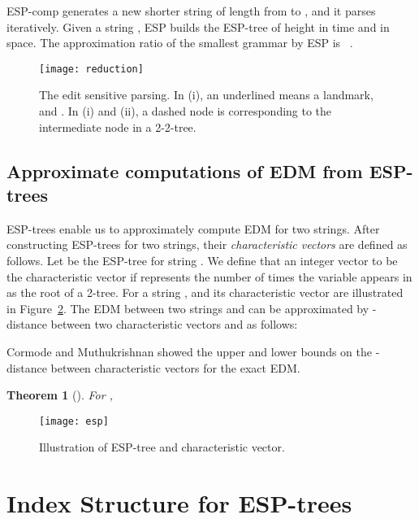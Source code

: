 \documentclass[12pt,a4paper]{scrartcl}
\newtheorem{Theorem}{Theorem}
\begin{document}
ESP-comp generates a new shorter string  of length from  to
, and it parses  iteratively.  Given a string , ESP builds
the ESP-tree of height  in  time and in
 space.  The approximation ratio of the
smallest grammar by ESP is ~\cite{SakamotoMKS09}.

\begin{figure}[t]
\begin{center}
\texttt{[image: reduction]}
\end{center}
\vspace{0.5cm}
\caption{The edit sensitive parsing. In (i), an underlined  means a landmark,
and .
In (i) and (ii), a dashed node is corresponding to the intermediate node in a 2-2-tree.}
\label{fig:reduction}
\end{figure}

\subsection{Approximate computations of EDM from ESP-trees}

ESP-trees enable us to approximately compute EDM for two strings.
After constructing ESP-trees for two strings, 
their \emph{characteristic vectors} are defined as follows.
Let  be the ESP-tree for string .
We define that an integer vector  to be the characteristic vector if
 represents the number of times the variable  appears in  as the root of a 2-tree.
For a string ,  and its characteristic vector are illustrated in Figure~\ref{fig:esp}.
The EDM between two strings  and  can be approximated by -distance between two characteristic vectors 
 and  as follows:


Cormode and Muthukrishnan showed the upper and lower bounds on the
-distance between characteristic vectors for the exact EDM.
\begin{Theorem}[\cite{Cormode07}]\label{thm:approx}
For , 

\end{Theorem}

\begin{figure}[t]
\begin{center}
\texttt{[image: esp]}
\end{center}
\vspace{-0.6cm}
\caption{Illustration of ESP-tree and characteristic vector.}
\label{fig:esp}
\end{figure}


\section{Index Structure for ESP-trees}\label{sec:isESP}
\end{document}
